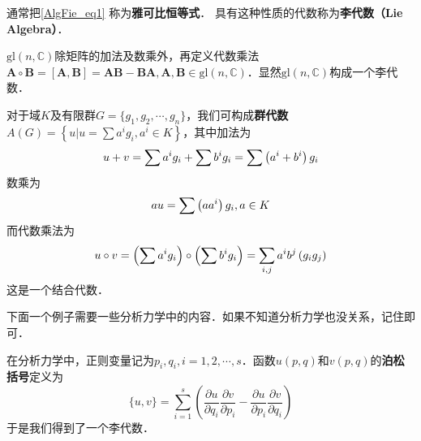 通常把\autoref{AlgFie_eq1} 称为\textbf{雅可比恒等式}． 具有这种性质的代数称为\textbf{李代数（Lie Algebra）}．

\begin{example}{}
$\mathrm{gl}(n, \mathbb C)$除矩阵的加法及数乘外，再定义代数乘法$\mathbf A\circ \mathbf B=[\mathbf A, \mathbf B] = \mathbf A \mathbf B - \mathbf B\mathbf A, \mathbf A, \mathbf B\in \mathrm{gl}(n, \mathbb C)$．显然$\mathrm{gl}(n,\mathbb C)$构成一个李代数．
\end{example}

\begin{example}{}
对于域$K $及有限群$G=\{g_1,g_2,\cdots,g_n\}$，我们可构成\textbf{群代数}$\displaystyle A(G)=\left\{u | u=\sum a^{i} g_{i}, a^{i} \in K\right\}$，其中加法为
\begin{equation}
u+v=\sum a^{i} g_{i}+\sum b^{i} g_{i}=\sum\left(a^{i}+b^{i}\right) g_{i} \notag
\end{equation}
数乘为
\begin{equation}
a u=\sum\left(a a^{i}\right) g_{i}, a \in K \notag
\end{equation}
而代数乘法为
\begin{equation}
u \circ v=\left(\sum a^{i} g_{i}\right) \circ\left(\sum b^{i} g_{i}\right)=\sum_{i, j} a^{i} b^{j}\left(g_{i} g_{j}\right) \notag
\end{equation}
这是一个结合代数．
\end{example}

下面一个例子需要一些分析力学中的内容．如果不知道分析力学也没关系，记住即可．
\begin{example}{}
在分析力学中，正则变量记为$p_i,q_i, i=1,2,\cdots, s$．函数$u(p,q)$和$v(p, q)$的\textbf{泊松括号}定义为\begin{equation}
\{u, v\}=\sum_{i=1}^{s}\left(\frac{\partial u}{\partial q_{i}} \frac{\partial v}{\partial p_{i}}-\frac{\partial u}{\partial p_{i}} \frac{\partial v}{\partial q_{i}}\right)
\end{equation}
于是我们得到了一个李代数．
\end{example}
